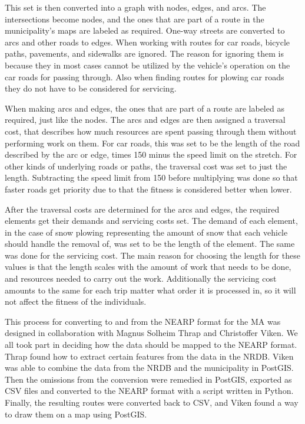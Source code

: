 This set is then converted into a graph with nodes, edges, and arcs. The intersections become nodes, and the ones that are part of a route in the municipality's maps are labeled as required. One-way streets are converted to arcs and other roads to edges. When working with routes for car roads, bicycle paths, pavements, and sidewalks are ignored. The reason for ignoring them is because they in most cases cannot be utilized by the vehicle's operation on the car roads for passing through. Also when finding routes for plowing car roads they do not have to be considered for servicing.

When making arcs and edges, the ones that are part of a route are labeled as required, just like the nodes. The arcs and edges are then assigned a traversal cost, that describes how much resources are spent passing through them without performing work on them. For car roads, this was set to be the length of the road described by the arc or edge, times 150 minus the speed limit on the stretch. For other kinds of underlying roads or paths, the traversal cost was set to just the length. Subtracting the speed limit from 150 before multiplying was done so that faster roads get priority due to that the fitness is considered better when lower.

After the traversal costs are determined for the arcs and edges, the required elements get their demands and servicing costs set. The demand of each element, in the case of snow plowing representing the amount of snow that each vehicle should handle the removal of, was set to be the length of the element. The same was done for the servicing cost. The main reason for choosing the length for these values is that the length scales with the amount of work that needs to be done, and resources needed to carry out the work. Additionally the servicing cost amounts to the same for each trip matter what order it is processed in, so it will not affect the fitness of the individuals.

This process for converting to and from the NEARP format for the MA was designed in collaboration with Magnus Solheim Thrap and Christoffer Viken. We all took part in deciding how the data should be mapped to the NEARP format. Thrap found how to extract certain features from the data in the NRDB. Viken was able to combine the data from the NRDB and the municipality in PostGIS. Then the omissions from the conversion were remedied in PostGIS, exported as CSV files and converted to the NEARP format with a script written in Python. Finally, the resulting routes were converted back to CSV, and Viken found a way to draw them on a map using PostGIS.

